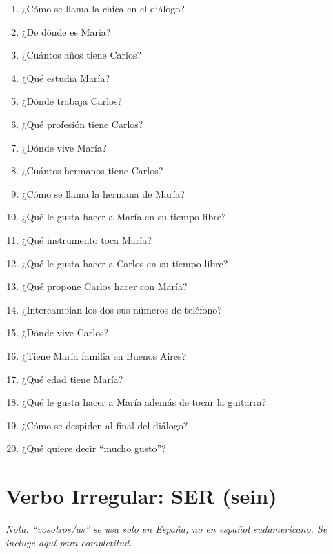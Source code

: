 \documentclass[12pt,a4paper]{article}
\begin{document}
\begin{enumerate}[leftmargin=*]
    \item ¿Cómo se llama la chica en el diálogo?
    \item ¿De dónde es María?
    \item ¿Cuántos años tiene Carlos?
    \item ¿Qué estudia María?
    \item ¿Dónde trabaja Carlos?
    \item ¿Qué profesión tiene Carlos?
    \item ¿Dónde vive María?
    \item ¿Cuántos hermanos tiene Carlos?
    \item ¿Cómo se llama la hermana de María?
    \item ¿Qué le gusta hacer a María en su tiempo libre?
    \item ¿Qué instrumento toca María?
    \item ¿Qué le gusta hacer a Carlos en su tiempo libre?
    \item ¿Qué propone Carlos hacer con María?
    \item ¿Intercambian los dos sus números de teléfono?
    \item ¿Dónde vive Carlos?
    \item ¿Tiene María familia en Buenos Aires?
    \item ¿Qué edad tiene María?
    \item ¿Qué le gusta hacer a María además de tocar la guitarra?
    \item ¿Cómo se despiden al final del diálogo?
    \item ¿Qué quiere decir \enquote{mucho gusto}?
\end{enumerate}

\newpage

\section*{Verbo Irregular: SER (sein)}

\textit{Nota: \enquote{vosotros/as} se usa solo en España, no en español sudamericano. Se incluye aquí para completitud.}
\end{document}
